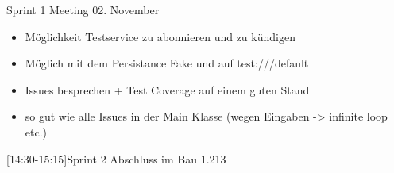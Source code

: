 
\begin{Protokoll}{Sprint 1 Meeting 02. November}
\protokollKopf

\begin{itemize}
  \item Möglichkeit Testservice zu abonnieren und zu kündigen
  \item Möglich mit dem Persistance Fake und auf test:///default
\end{itemize}

\begin{itemize}
  \item Issues besprechen + Test Coverage auf einem guten Stand
  \item so gut wie alle Issues in der Main Klasse (wegen Eingaben -> infinite loop etc.)
\end{itemize}

[14:30-15:15]{Sprint 2 Abschluss im Bau 1.213}




\end{Protokoll}


